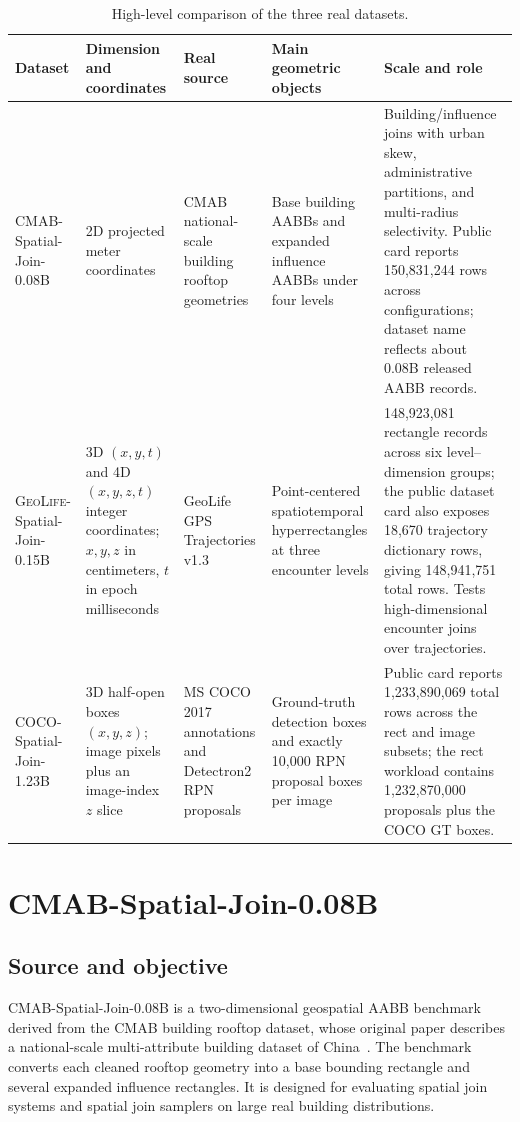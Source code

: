 \documentclass[11pt]{article}
\newcommand{\cmab}{\textsc{CMAB}}
\newcommand{\geolife}{\textsc{GeoLife}}
\newcommand{\coco}{\textsc{COCO}}
\begin{document}
\begin{table}[t]
\centering
\small
\begin{tabularx}{\textwidth}{@{}lYYYY@{}}
\toprule
Dataset & Dimension and coordinates & Real source & Main geometric objects & Scale and role \\
\midrule
\cmab-Spatial-Join-0.08B & 2D projected meter coordinates & CMAB national-scale building rooftop geometries & Base building AABBs and expanded influence AABBs under four levels & Building/influence joins with urban skew, administrative partitions, and multi-radius selectivity. Public card reports 150,831,244 rows across configurations; dataset name reflects about 0.08B released AABB records. \\
\addlinespace
\geolife-Spatial-Join-0.15B & 3D $(x,y,t)$ and 4D $(x,y,z,t)$ integer coordinates; $x,y,z$ in centimeters, $t$ in epoch milliseconds & GeoLife GPS Trajectories v1.3 & Point-centered spatiotemporal hyperrectangles at three encounter levels & 148,923,081 rectangle records across six level--dimension groups; the public dataset card also exposes 18,670 trajectory dictionary rows, giving 148,941,751 total rows. Tests high-dimensional encounter joins over trajectories. \\
\addlinespace
\coco-Spatial-Join-1.23B & 3D half-open boxes $(x,y,z)$; image pixels plus an image-index $z$ slice & MS COCO 2017 annotations and Detectron2 RPN proposals & Ground-truth detection boxes and exactly 10,000 RPN proposal boxes per image & Public card reports 1,233,890,069 total rows across the rect and image subsets; the rect workload contains 1,232,870,000 proposals plus the COCO GT boxes. \\
\bottomrule
\end{tabularx}
\caption{High-level comparison of the three real datasets.}
\label{tab:real-dataset-summary}
\end{table}

\section{\cmab-Spatial-Join-0.08B}
\label{sec:cmab}

\subsection{Source and objective}

\cmab-Spatial-Join-0.08B is a two-dimensional geospatial AABB benchmark derived from the CMAB building rooftop dataset, whose original paper describes a national-scale multi-attribute building dataset of China~\cite{CMABPaper,CMABFigshare,CMABBuilder,CMABHF}.  The benchmark converts each cleaned rooftop geometry into a base bounding rectangle and several expanded influence rectangles.  It is designed for evaluating spatial join systems and spatial join samplers on large real building distributions.
\end{document}
